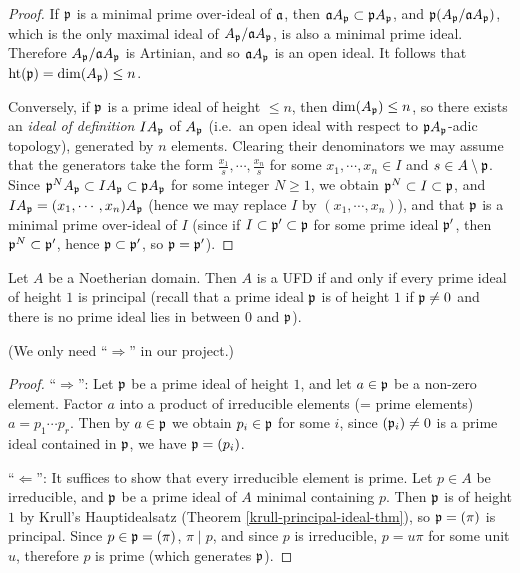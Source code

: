 \begin{proof}
If ${\mathfrak{p}}$ is a minimal prime over-ideal of ${\mathfrak{a}}$, then ${\mathfrak{a}} A_{\mathfrak{p}}\subset{\mathfrak{p}} A_{\mathfrak{p}}$,
and ${\mathfrak{p}}(A_{\mathfrak{p}}/{\mathfrak{a}} A_{\mathfrak{p}})$, which is the only maximal ideal of
$A_{\mathfrak{p}}/{\mathfrak{a}} A_{\mathfrak{p}}$, is also a minimal prime ideal.
Therefore $A_{\mathfrak{p}}/{\mathfrak{a}} A_{\mathfrak{p}}$ is Artinian, and so
${\mathfrak{a}} A_{\mathfrak{p}}$ is an open ideal. It follows that ${\mathrm{ht}}({\mathfrak{p}})=\dim(A_{\mathfrak{p}})\leq n$.

Conversely, if ${\mathfrak{p}}$ is a prime ideal of height $\leq n$,
then $\dim(A_{\mathfrak{p}})\leq n$, so there exists an \emph{ideal of definition}
$IA_{\mathfrak{p}}$ of $A_{\mathfrak{p}}$
(i.e.~an open ideal with respect to ${\mathfrak{p}} A_{\mathfrak{p}}$-adic topology),
generated by $n$ elements.
Clearing their denominators we may assume that the generators take the form
$\frac{x_1}s,\cdots,\frac{x_n}s$ for some $x_1,\cdots,x_n\in I$
and $s\in A\setminus{\mathfrak{p}}$.
Since ${\mathfrak{p}}^NA_{\mathfrak{p}}\subset IA_{\mathfrak{p}}\subset{\mathfrak{p}} A_{\mathfrak{p}}$ for some integer $N\geq 1$,
we obtain ${\mathfrak{p}}^N\subset I\subset{\mathfrak{p}}$, and
$IA_{\mathfrak{p}}=(x_1,\cdots,x_n)A_{\mathfrak{p}}$
(hence we may replace $I$ by $(x_1,\cdots,x_n)$), and that ${\mathfrak{p}}$ is a minimal prime over-ideal of $I$
(since if $I\subset{\mathfrak{p}}'\subset{\mathfrak{p}}$ for some prime ideal ${\mathfrak{p}}'$,
then ${\mathfrak{p}}^N\subset{\mathfrak{p}}'$, hence ${\mathfrak{p}}\subset{\mathfrak{p}}'$, so ${\mathfrak{p}}={\mathfrak{p}}'$).
\end{proof}

\begin{thm}
\label{UFD-iff-ht-1-principal}
Let $A$ be a Noetherian domain. Then $A$ is a UFD if and only if every prime ideal of height $1$ is principal
(recall that a prime ideal ${\mathfrak{p}}$ is of height $1$ if ${\mathfrak{p}} \neq 0$ and there is no prime ideal lies in between $0$ and ${\mathfrak{p}}$).

(We only need ``$\Rightarrow$'' in our project.)
\end{thm}

\begin{proof}
``$\Rightarrow$'':
Let ${\mathfrak{p}}$ be a prime ideal of height $1$,
and let $a\in{\mathfrak{p}}$ be a non-zero element.
Factor $a$ into a product of irreducible elements
(= prime elements) $a=p_1\cdots p_r$.
Then by $a\in{\mathfrak{p}}$ we obtain $p_i\in{\mathfrak{p}}$ for some $i$,
since $({\mathfrak{p}}_i)\neq 0$ is a prime ideal contained in ${\mathfrak{p}}$, we have ${\mathfrak{p}}=(p_i)$.

``$\Leftarrow$'':
It suffices to show that every irreducible element is prime.
Let $p\in A$ be irreducible, and ${\mathfrak{p}}$ be a prime ideal of $A$ minimal containing $p$.
Then ${\mathfrak{p}}$ is of height $1$ by Krull's Hauptidealsatz
(Theorem \ref{krull-principal-ideal-thm}),
so ${\mathfrak{p}}=(\pi)$ is principal.
Since $p\in{\mathfrak{p}}=(\pi)$, $\pi\mid p$, and since $p$ is irreducible,
$p=u\pi$ for some unit $u$, therefore $p$ is prime (which generates ${\mathfrak{p}}$).
\end{proof}

